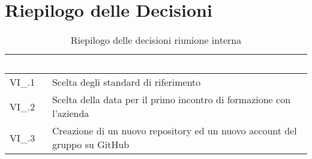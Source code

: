 \section{Riepilogo delle Decisioni}


\begin{table}[!htbp]
\renewcommand{\arraystretch}{1.5}
\begin{tabular}{m{}<{\centering}  m{}<{\centering}}
\rowcolor{darkblue} \textcolor{white}{\textbf{Codice}} & \textcolor{white}{\textbf{Decisione}} \\
\hline
VI\_\D{}.1 & Scelta degli standard di riferimento \\
\rowcolor{gray!25} VI\_\D{}.2 & Scelta della data per il primo incontro di formazione con l'azienda \\
VI\_\D{}.3 & Creazione di un nuovo repository ed un nuovo account del gruppo su GitHub \\
\end{tabular}
\caption{Riepilogo delle decisioni riunione interna \D{}}
\end{table}